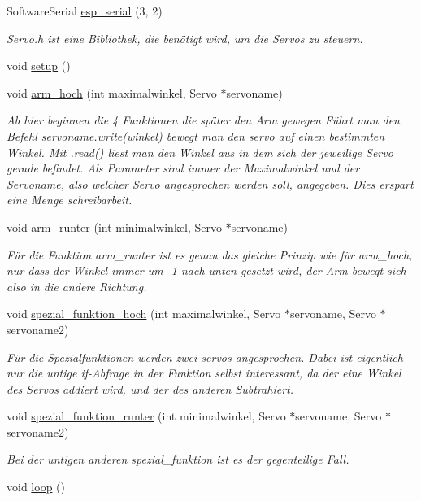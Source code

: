 \begin{DoxyCompactItemize}
\item 
Software\+Serial \hyperlink{_arduino__kommentiert_8ino_af690b3a6882292855c4091ede8039998}{esp\+\_\+serial} (3, 2)
\begin{DoxyCompactList}\small\item\em Servo.\+h ist eine Bibliothek, die benötigt wird, um die Servos zu steuern. \end{DoxyCompactList}\item 
void \hyperlink{_arduino__kommentiert_8ino_a4fc01d736fe50cf5b977f755b675f11d}{setup} ()
\item 
void \hyperlink{_arduino__kommentiert_8ino_a74bfcf85e5418694eb99df53d30c8fab}{arm\+\_\+hoch} (int maximalwinkel, Servo $\ast$servoname)
\begin{DoxyCompactList}\small\item\em Ab hier beginnen die 4 Funktionen die später den Arm gewegen Führt man den Befehl servoname.\+write(winkel) bewegt man den servo auf einen bestimmten Winkel. Mit .read() liest man den Winkel aus in dem sich der jeweilige Servo gerade befindet. Als Parameter sind immer der Maximalwinkel und der Servoname, also welcher Servo angesprochen werden soll, angegeben. Dies erspart eine Menge schreibarbeit. \end{DoxyCompactList}\item 
void \hyperlink{_arduino__kommentiert_8ino_a5b873994166a952d81f787c307ca08d9}{arm\+\_\+runter} (int minimalwinkel, Servo $\ast$servoname)
\begin{DoxyCompactList}\small\item\em Für die Funktion arm\+\_\+runter ist es genau das gleiche Prinzip wie für arm\+\_\+hoch, nur dass der Winkel immer um -\/1 nach unten gesetzt wird, der Arm bewegt sich also in die andere Richtung. \end{DoxyCompactList}\item 
void \hyperlink{_arduino__kommentiert_8ino_ac03f54892f7473625ec7d6498ea5a010}{spezial\+\_\+funktion\+\_\+hoch} (int maximalwinkel, Servo $\ast$servoname, Servo $\ast$servoname2)
\begin{DoxyCompactList}\small\item\em Für die Spezialfunktionen werden zwei servos angesprochen. Dabei ist eigentlich nur die untige if-\/\+Abfrage in der Funktion selbst interessant, da der eine Winkel des Servos addiert wird, und der des anderen Subtrahiert. \end{DoxyCompactList}\item 
void \hyperlink{_arduino__kommentiert_8ino_abf7a5d6cd0eca7c0dacb61f5ef555beb}{spezial\+\_\+funktion\+\_\+runter} (int minimalwinkel, Servo $\ast$servoname, Servo $\ast$servoname2)
\begin{DoxyCompactList}\small\item\em Bei der untigen anderen spezial\+\_\+funktion ist es der gegenteilige Fall. \end{DoxyCompactList}\item 
void \hyperlink{_arduino__kommentiert_8ino_afe461d27b9c48d5921c00d521181f12f}{loop} ()
\end{DoxyCompactItemize}
